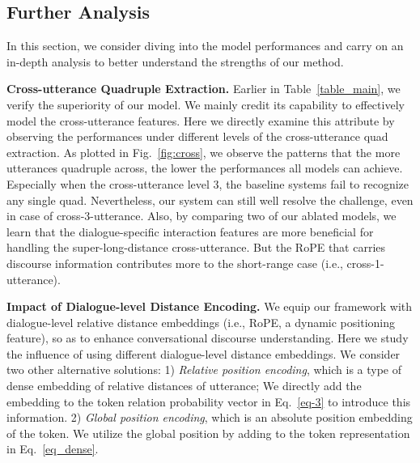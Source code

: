 \documentclass[11pt]{article}
\begin{document}
\vspace{-1mm}
\subsection{Further Analysis}

\vspace{-1mm}
In this section, we consider diving into the model performances and carry on an in-depth analysis to better understand the strengths of our method.

\vspace{2pt}
\noindent\textbf{Cross-utterance Quadruple Extraction.}
Earlier in Table~\ref{table_main}, we verify the superiority of our model.
We mainly credit its capability to effectively model the cross-utterance features.
Here we directly examine this attribute by observing the performances under different levels of the cross-utterance quad extraction.
As plotted in Fig.~\ref{fig:cross}, we observe the patterns that the more utterances quadruple across, the lower the performances all models can achieve.
Especially when the cross-utterance level 3, the baseline systems fail to recognize any single quad.
Nevertheless, our system can still well resolve the challenge, even in case of cross-3-utterance.
Also, by comparing two of our ablated models, we learn that the dialogue-specific interaction features are more beneficial for handling the super-long-distance cross-utterance.
But the RoPE that carries discourse information contributes more to the short-range case (i.e., cross-1-utterance).

\vspace{2pt}
\noindent\textbf{Impact of Dialogue-level Distance Encoding.}
We equip our framework with dialogue-level relative distance embeddings (i.e., RoPE, a dynamic positioning feature), so as to enhance conversational discourse understanding.
Here we study the influence of using different dialogue-level distance embeddings.
We consider two other alternative solutions:
1) \emph{Relative position encoding}, which is a type of dense embedding of relative distances of utterance;
We directly add the embedding to the token relation probability vector in Eq.~\eqref{eq-3} to introduce this information. 
2) \emph{Global position encoding}, which is an absolute position embedding of the token. 
We utilize the global position by adding to the token representation  in Eq.~\eqref{eq_dense}.
\end{document}
